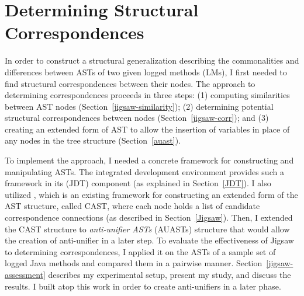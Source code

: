 \chapter{Determining Structural Correspondences}\label{background2}
In order to construct a structural generalization describing the commonalities and differences between ASTs of two given logged methods (LMs), I first needed to find structural correspondences between their nodes. The approach to determining correspondences proceeds in three steps: (1) computing similarities between AST nodes (Section~\ref{jigsaw-similarity}); (2) determining potential structural correspondences between nodes (Section~\ref{jigsaw-corr}); and (3) creating an extended form of AST to allow the insertion of variables in place of any nodes in the tree structure (Section~\ref{auast}).


To implement the approach, I needed a concrete framework for constructing and manipulating ASTs. The  integrated development environment provides such a framework in its  (JDT) component (as explained in Section~\ref{JDT}). I also utilized  \cite{2008:fse:cottrell}, which is an existing framework for constructing an extended form of the AST structure, called CAST, where each node holds a list of candidate correspondence connections (as described in Section~\ref{Jigsaw}). Then, I extended the CAST structure to \emph{anti-unifier ASTs} (AUASTs) structure that would allow the creation of anti-unifier in a later step. To evaluate the effectiveness of Jigsaw to determining correspondences, I applied it on the ASTs of a sample set of logged Java methods and compared them in a pairwise manner. Section~\ref{jigsaw-assessment} describes my experimental setup, present my study, and discuss the results. I built atop this work in order to create anti-unifiers in a later phase.





